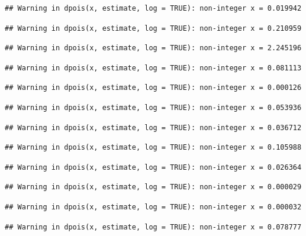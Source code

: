 \documentclass[]{article}
\begin{document}
\begin{verbatim}
## Warning in dpois(x, estimate, log = TRUE): non-integer x = 0.019942
\end{verbatim}

\begin{verbatim}
## Warning in dpois(x, estimate, log = TRUE): non-integer x = 0.210959
\end{verbatim}

\begin{verbatim}
## Warning in dpois(x, estimate, log = TRUE): non-integer x = 2.245196
\end{verbatim}

\begin{verbatim}
## Warning in dpois(x, estimate, log = TRUE): non-integer x = 0.081113
\end{verbatim}

\begin{verbatim}
## Warning in dpois(x, estimate, log = TRUE): non-integer x = 0.000126
\end{verbatim}

\begin{verbatim}
## Warning in dpois(x, estimate, log = TRUE): non-integer x = 0.053936
\end{verbatim}

\begin{verbatim}
## Warning in dpois(x, estimate, log = TRUE): non-integer x = 0.036712
\end{verbatim}

\begin{verbatim}
## Warning in dpois(x, estimate, log = TRUE): non-integer x = 0.105988
\end{verbatim}

\begin{verbatim}
## Warning in dpois(x, estimate, log = TRUE): non-integer x = 0.026364
\end{verbatim}

\begin{verbatim}
## Warning in dpois(x, estimate, log = TRUE): non-integer x = 0.000029
\end{verbatim}

\begin{verbatim}
## Warning in dpois(x, estimate, log = TRUE): non-integer x = 0.000032
\end{verbatim}

\begin{verbatim}
## Warning in dpois(x, estimate, log = TRUE): non-integer x = 0.078777
\end{verbatim}
\end{document}
